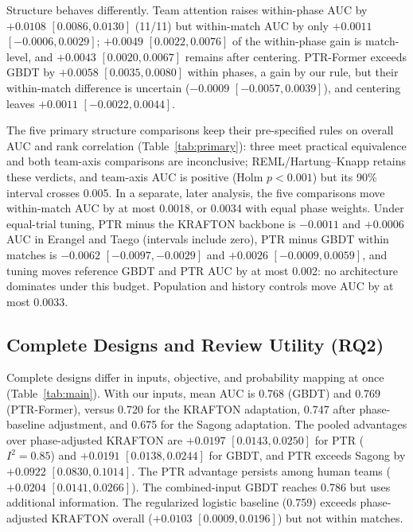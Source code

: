 \documentclass[sigconf,anonymous,nonacm]{acmart}
\begin{document}
Structure behaves differently. Team attention raises within-phase AUC by $+0.0108$ $[0.0086,\allowbreak 0.0130]$ (11/11) but within-match AUC by only $+0.0011$ $[-0.0006,\allowbreak 0.0029]$; $+0.0049$ $[0.0022,\allowbreak 0.0076]$ of the within-phase gain is match-level, and $+0.0043$ $[0.0020,\allowbreak 0.0067]$ remains after centering. PTR-Former exceeds GBDT by $+0.0058$ $[0.0035,\allowbreak 0.0080]$ within phases, a gain by our rule, but their within-match difference is uncertain ($-0.0009$ $[-0.0057,\allowbreak 0.0039]$), and centering leaves $+0.0011$ $[-0.0022,\allowbreak 0.0044]$.


The five primary structure comparisons keep their pre-specified rules on overall AUC and rank correlation (Table~\ref{tab:primary}): three meet practical equivalence and both team-axis comparisons are inconclusive; REML/Hartung--Knapp retains these verdicts, and team-axis AUC is positive (Holm $p<0.001$) but its 90\% interval crosses 0.005. In a separate, later analysis, the five comparisons move within-match AUC by at most 0.0018, or 0.0034 with equal phase weights. Under equal-trial tuning, PTR minus the KRAFTON backbone is $-0.0011$ and $+0.0006$ AUC in Erangel and Taego (intervals include zero), PTR minus GBDT within matches is $-0.0062$ $[-0.0097,\allowbreak -0.0029]$ and $+0.0026$ $[-0.0009,\allowbreak 0.0059]$, and tuning moves reference GBDT and PTR AUC by at most 0.002: no architecture dominates under this budget. Population and history controls move AUC by at most 0.0033.

\subsection{Complete Designs and Review Utility (RQ2)}
\label{sec:results:designs}

Complete designs differ in inputs, objective, and probability mapping at once (Table~\ref{tab:main}). With our inputs, mean AUC is 0.768 (GBDT) and 0.769 (PTR-Former), versus 0.720 for the KRAFTON adaptation, 0.747 after phase-baseline adjustment, and 0.675 for the Sagong adaptation. The pooled advantages over phase-adjusted KRAFTON are $+0.0197$ $[0.0143,\allowbreak 0.0250]$ for PTR ($I^2=0.85$) and $+0.0191$ $[0.0138,\allowbreak 0.0244]$ for GBDT, and PTR exceeds Sagong by $+0.0922$ $[0.0830,\allowbreak 0.1014]$. The PTR advantage persists among human teams ($+0.0204$ $[0.0141,\allowbreak 0.0266]$). The combined-input GBDT reaches 0.786 but uses additional information. The regularized logistic baseline (0.759) exceeds phase-adjusted KRAFTON overall ($+0.0103$ $[0.0009,\allowbreak 0.0196]$) but not within matches.
\end{document}
